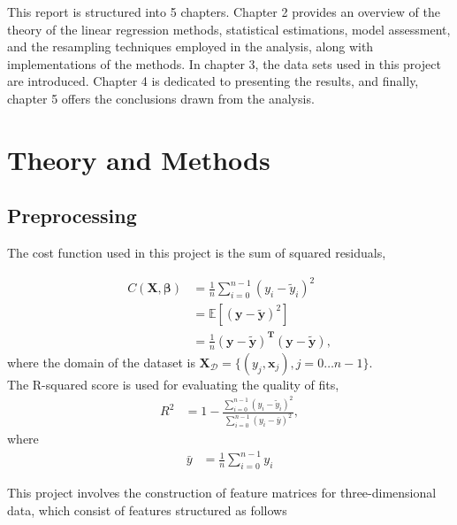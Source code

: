 \documentclass[a4paper,12pt]{article}
\begin{document}
\noindent
This report is structured into 5 chapters. Chapter 2 provides an overview of the theory of the linear regression methods, statistical estimations, model assessment, and the resampling techniques employed in the analysis, along with implementations of the methods. In chapter 3, the data sets used in this project are introduced. Chapter 4 is dedicated to presenting the results, and finally, chapter 5 offers the conclusions drawn from the analysis.\\



\section{Theory and Methods}
\subsection{Preprocessing}
The cost function used in this project is the sum of squared residuals,


\begin{equation} \label{eq1}
\begin{split}
C(\boldsymbol{X},\boldsymbol{\beta}) &=\frac{1}{n}\sum_{i=0}^{n-1}(y_i-\tilde{y}_i)^2\\
&=\mathbb{E}\left[(\boldsymbol{y}-\boldsymbol{\tilde{y}})^2\right] \\
&=\frac{1}{n} (\boldsymbol{y-\tilde{y}})^{\boldsymbol{T}} (\boldsymbol{y-\tilde{y}}),
\end{split}
\end{equation}
where the domain of the dataset is $\mathbf{X}_\mathcal{D}=\{(y_j, \boldsymbol{x}_j), j=0\ldots n-1\}$.\\

\noindent
The R-squared score is used for evaluating the quality of fits,
\begin{equation} \label{eq1}
\begin{split}
R^2 &=1-\frac{\sum_{i=0}^{n-1}(y_i-\tilde{y}_i)^2}{\sum_{i=0}^{n-1}(y_i-\bar{y})^2},
\end{split}
\end{equation}
\noindent
where
\begin{equation} \label{eq1}
\begin{split}
\bar{y} &=\frac{1}{n}\sum_{i=0}^{n-1}y_i
\end{split}
\end{equation}

\noindent
This project involves the construction of feature matrices for three-dimensional data, which consist of features structured as follows
\end{document}
